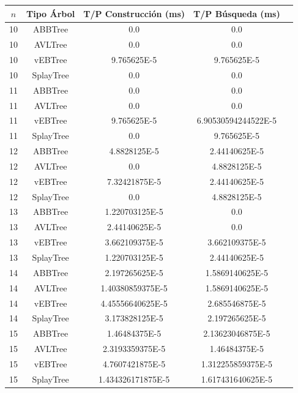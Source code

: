 \documentclass[letterpaper,12pt]{article}
\begin{document}
\begin{tabular}{|c|c|c|c|c|}
\hline
\textbf{$n$} & \textbf{Tipo Árbol} & \textbf{T/P Construcción (ms)} & \textbf{T/P Búsqueda (ms)} \\
\hline
10 & ABBTree & 0.0 & 0.0 \\
\hline
10 & AVLTree & 0.0 & 0.0 \\
\hline
10 & vEBTree & 9.765625E-5 & 9.765625E-5\\
\hline
10 & SplayTree & 0.0 & 0.0 \\
\hline
\hline
11 & ABBTree & 0.0 & 0.0  \\
\hline
11 & AVLTree & 0.0 & 0.0 \\
\hline
11 & vEBTree & 9.765625E-5 & 6.90530594244522E-5\\
\hline
11 & SplayTree & 0.0 & 9.765625E-5 \\
\hline
\hline
12 & ABBTree & 4.8828125E-5 & 2.44140625E-5  \\
\hline
12 & AVLTree & 0.0 & 4.8828125E-5 \\
\hline
12 & vEBTree & 7.32421875E-5 & 2.44140625E-5\\
\hline
12 & SplayTree & 0.0 & 4.8828125E-5 \\
\hline
\hline
13 & ABBTree & 1.220703125E-5 & 0.0  \\
\hline
13 & AVLTree & 2.44140625E-5 & 0.0 \\
\hline
13 & vEBTree & 3.662109375E-5 & 3.662109375E-5 \\
\hline
13 & SplayTree & 1.220703125E-5 & 2.44140625E-5  \\
\hline
\hline
14 & ABBTree & 2.197265625E-5 & 1.5869140625E-5 \\
\hline
14 & AVLTree & 1.40380859375E-5 & 1.5869140625E-5 \\
\hline
14 & vEBTree & 4.45556640625E-5 & 2.685546875E-5\\
\hline
14 & SplayTree & 3.173828125E-5 & 2.197265625E-5 \\
\hline
\hline
15 & ABBTree & 1.46484375E-5 & 2.13623046875E-5 \\
\hline
15 & AVLTree & 2.3193359375E-5 & 1.46484375E-5 \\
\hline
15 & vEBTree & 4.7607421875E-5  & 1.312255859375E-5\\
\hline
15 & SplayTree & 1.434326171875E-5 & 1.617431640625E-5 \\
\hline
\end{tabular}
\end{document}
